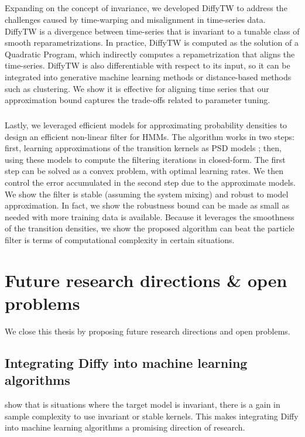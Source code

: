 \subparagraph{}
Expanding on the concept of invariance, we developed DiffyTW to address the challenges caused by time-warping and misalignment in time-series data. DiffyTW is a divergence between time-series that is invariant to a tunable class of smooth reparametrizations. In practice, DiffyTW is computed as the solution of a Quadratic Program, which indirectly computes a repametrization that aligns the time-series. DiffyTW is also differentiable with respect to its input, so it can be integrated into generative machine learning methods or distance-based methods such as clustering. We show it is effective for aligning time series that our approximation bound captures the trade-offs related to parameter tuning.

\subparagraph{}
Lastly, we leveraged efficient models for approximating probability densities to design an efficient non-linear filter for HMMs. The algorithm works in two steps: first, learning approximations of the transition kernels as PSD models ; then, using these models to compute the filtering iterations in closed-form. The first step can be solved as a convex problem, with optimal learning rates. We then control the error accumulated in the second step due to the approximate models. We show the filter is stable (assuming the system mixing) and robust to model approximation. In fact, we show the robustness bound can be made as small as needed with more training data is available. Because it leverages the smoothness of the transition densities, we show the proposed algorithm can beat the particle filter is terms of computational complexity in certain situations.

\section{Future research directions \& open problems}

We close this thesis by proposing future research directions and open problems.

\subsection{Integrating Diffy into machine learning algorithms}
\cite{bietti} show that is situations where the target model is invariant, there is a gain in sample complexity to use invariant or stable kernels. This makes integrating Diffy into machine learning algorithms a promising direction of research.

